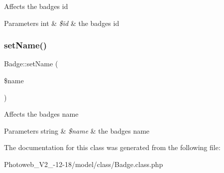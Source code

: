 Affects the badge\textquotesingle{}s id 
\begin{DoxyParams}[1]{Parameters}
int & {\em \$id} & the badge\textquotesingle{}s id \\
\hline
\end{DoxyParams}
\mbox{\label{classBadge_a3f66fcec8d521a4e1426283c44a6fb86}} 
\subsubsection{\texorpdfstring{set\+Name()}{setName()}}
{\footnotesize\ttfamily Badge\+::set\+Name (\begin{DoxyParamCaption}\item[{}]{\$name }\end{DoxyParamCaption})}

Affects the badge\textquotesingle{}s name 
\begin{DoxyParams}[1]{Parameters}
string & {\em \$name} & the badge\textquotesingle{}s name \\
\hline
\end{DoxyParams}


The documentation for this class was generated from the following file\+:\begin{DoxyCompactItemize}
\item 
Photoweb\+\_\+\+V2\+\_-\/12-\/18/model/class/Badge.\+class.\+php\end{DoxyCompactItemize}
